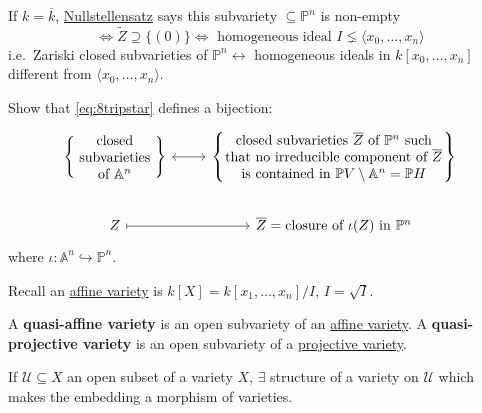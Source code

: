 \documentclass{article}
\newcommand{\A}{\mathbb{A}}
\newcommand{\proj}{\mathbb{P}}
\begin{document}
If $k = \overline{k}$, \hyperlink{def:null2}{Nullstellensatz} says this subvariety $\subseteq \proj^n$ is non-empty
\begin{equation*}
    \iff \tilde{Z} \supseteq \{(0)\} \iff \text{ homogeneous ideal } I \lneq \langle x_0, \dotsc, x_n \rangle
\end{equation*}
i.e.\ Zariski closed subvarieties of $\proj^n \longleftrightarrow$ homogeneous ideals in $k[x_0, \dotsc, x_n]$ different from $\langle x_0, \dotsc, x_n \rangle$.
\begin{ex}
    Show that \eqref{eq:8tripstar} defines a bijection:
    \begin{equation*}
        \begin{tikzcd}
            \left\{\parbox{2cm}{\centering closed subvarieties of $\A^n$}\right\} \rar[leftrightarrow]&
            \left\{\parbox{5.5cm}{\centering closed subvarieties $\overline{Z}$ of $\proj^n$ such that no irreducible component of $\overline{Z}$ is contained in $\proj V \setminus \A^n = \proj H$ }\right\} \\
            Z \rar[mapsto] &\overline{Z} = \text{closure of } \iota(Z) \text{ in } \proj^n
        \end{tikzcd}
    \end{equation*}
    where $\iota: \A^n \hookrightarrow \proj^n$.
\end{ex}
Recall an \hyperlink{def:affVar}{affine variety} is $k[X] = k[x_1, \dotsc, x_n]/I$, $I = \sqrt{I}$.
\begin{defi}[Quasivarieties]
    A \textbf{quasi-affine variety} is an open subvariety of an \hyperlink{def:affVar}{affine variety}.
    A \textbf{quasi-projective variety} is an open subvariety of a \hyperlink{def:projVar}{projective variety}.
\end{defi}
\begin{ex}
    If $\mathcal{U} \subseteq X$ an open subset of a variety $X$, $\exists$ structure of a variety on $\mathcal{U}$ which makes the embedding a morphism of varieties.
\end{ex}

\clearpage
\end{document}
